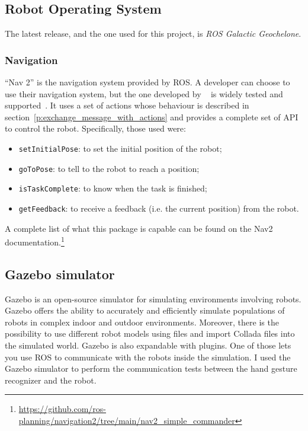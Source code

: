 \documentclass[../thesis.tex]{subfiles}
\begin{document}
\subsection{Robot Operating System}
The latest release, and the one used for this project, is \textit{ROS Galactic Geochelone}.

\subsubsection{Navigation}
``Nav 2'' is the navigation system provided by \gls{ROS}. A developer can choose to use their navigation system, but the one developed by ~\citeauthor{paper:navigation2} is widely tested and supported~\cite{paper:navigation2}. It uses a set of actions whose behaviour is described in section~\ref{p:exchange_message_with_actions} and provides a complete set of API to control the robot. Specifically, those used were:
\begin{itemize}
    \item \texttt{setInitialPose}: to set the initial position of the robot;
    \item \texttt{goToPose}: to tell to the robot to reach a position;
    \item \texttt{isTaskComplete}: to know when the task is finished;
    \item \texttt{getFeedback}: to receive a feedback (i.e. the current position) from the robot.
\end{itemize}
A complete list of what this package is capable can be found on the Nav2 documentation.\footnote{ \href{https://github.com/ros-planning/navigation2/tree/main/nav2_simple_commander}{https://github.com/ros-planning/navigation2/tree/main/nav2\_simple\_commander}}

\subsection{Gazebo simulator}
Gazebo is an open-source simulator for simulating environments involving robots. Gazebo offers the ability to accurately and efficiently simulate populations of robots in complex indoor and outdoor environments. Moreover, there is the possibility to use different robot models using   files and import Collada files into the simulated world. Gazebo is also expandable with plugins. One of those lets you use \acrshort{ROS} to communicate with the robots inside the simulation. I used the Gazebo simulator to perform the communication tests between the hand gesture recognizer and the robot.  
\end{document}
